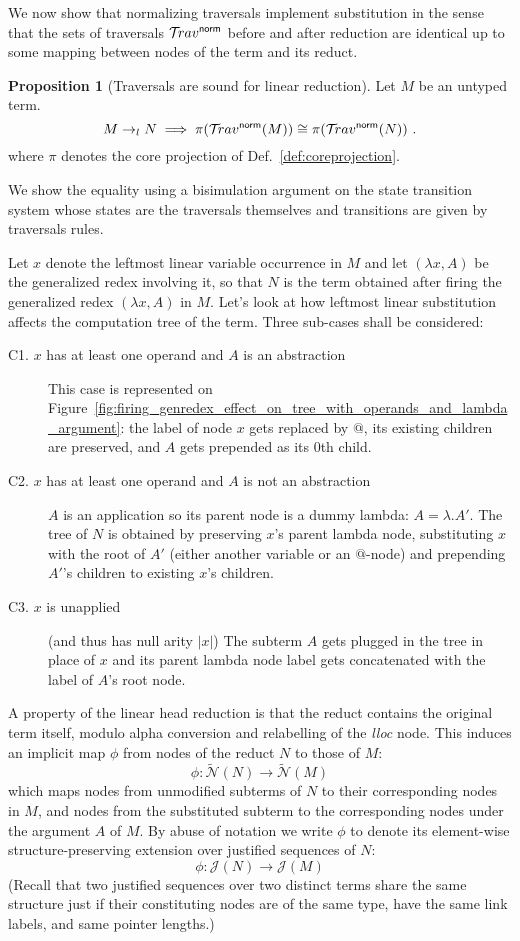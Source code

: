 \documentclass{article}
\theoremstyle{definition}
\newtheorem{proposition}{Proposition}[section]
\newcommand\Nodes{\mathcal{N}}%
\newcommand\ExtendedNodes{\tilde{\Nodes}}
\newcommand{\normalizing}{{\sf norm}}
\newcommand{\travsetnorm}{\travset^\normalizing}
\def\coresymbol{\pi} %
\def\justseqset{\mathcal{J}}
\begin{document}
We now show that normalizing traversals implement substitution in the sense that
the sets of traversals $\travsetnorm$ before and after reduction are identical up to some mapping between nodes of the term and its reduct.
\begin{proposition}[Traversals are sound for linear reduction]
\label{prop:ulctrav_impl_linear_reduction}
Let $M$ be an untyped term.
$$M \rightarrow_l N \implies \coresymbol(\travsetnorm(M)) \cong \coresymbol(\travsetnorm(N)) \ .
$$
where $\coresymbol$ denotes the core projection of Def.~\ref{def:coreprojection}.
\end{proposition}
\proofatend
We show the equality using a bisimulation argument on the state transition system whose states are the traversals themselves and transitions are given by traversals rules.

Let $x$ denote the leftmost linear variable occurrence in $M$
and let $(\lambda x, A)$ be the generalized redex involving it, so that $N$ is the term obtained after firing the generalized redex $(\lambda x, A)$ in $M$.
Let's look at how leftmost linear substitution affects the computation tree of the term. Three sub-cases shall be considered:
\begin{description}
    \item[C1. $x$ has at least one operand and $A$ is an abstraction]
    This case is represented on Figure~\ref{fig:firing_genredex_effect_on_tree_with_operands_and_lambda_argument}: the label of node $x$ gets replaced by $@$, its existing children are preserved, and $A$ gets prepended as its $0$th child.
    \item[C2. $x$ has at least one operand and $A$ is not an abstraction]
    $A$ is an application so its parent node is a dummy lambda: $A = \lambda. A'$. The tree of $N$ is obtained by preserving $x$'s parent lambda node, substituting $x$ with the root of $A'$ (either another variable or an $@$-node) and prepending $A'$'s children to existing $x$'s children.
    \item[C3. $x$ is unapplied] (and thus has null arity $|x|$)
    The subterm $A$ gets plugged in the tree in place of $x$ and its parent lambda node label gets concatenated with the label of $A$'s root node.
\end{description}

A property of the linear head reduction is that the reduct contains the original term itself, modulo alpha conversion and relabelling of the \emph{lloc} node. This induces an implicit map $\phi$ from nodes of the reduct $N$ to those of $M$:
$$\phi : \ExtendedNodes(N)  \rightarrow \ExtendedNodes(M) $$
which maps nodes from unmodified subterms of $N$ to their corresponding nodes in $M$, and nodes from the substituted subterm to the corresponding nodes under the argument $A$ of $M$. By abuse of notation we write $\phi$ to denote its element-wise structure-preserving extension over justified sequences of $N$:
$$\phi : \justseqset(N)  \rightarrow \justseqset(M) $$
(Recall that two justified sequences over two distinct terms share the same structure just if their constituting nodes are of the same type, have the same link labels, and same pointer lengths.)
\end{document}
